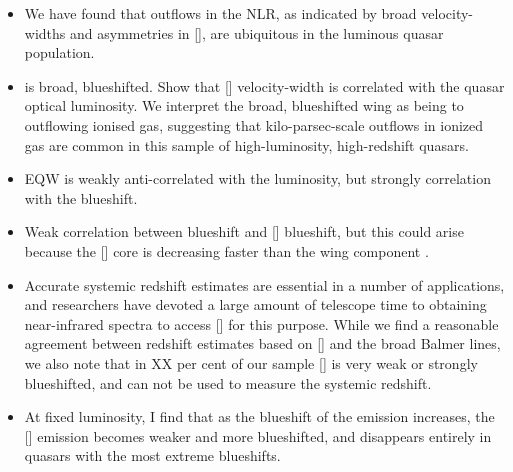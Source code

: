 \begin{itemize}

\item We have found that outflows in the NLR, as indicated by broad velocity-widths and asymmetries in [], are ubiquitous in the luminous quasar population. 

\item [\ion{O}{III}] is broad, blueshifted. Show that [] velocity-width is correlated with the quasar optical luminosity. We interpret the broad, blueshifted wing as being to outflowing ionised gas, suggesting that kilo-parsec-scale outflows in ionized gas are common in this sample of high-luminosity, high-redshift quasars.

\item [\ion{O}{III}] EQW is weakly anti-correlated with the luminosity, but strongly correlation with the  blueshift. 

\item Weak correlation between  blueshift and [] blueshift, but this could arise because the [] core is decreasing faster than the wing component \citep[e.g.][]{shen14}. 

\item Accurate systemic redshift estimates are essential in a number of applications, and researchers have devoted a large amount of telescope time to obtaining near-infrared spectra to access [] for this purpose. While we find a reasonable agreement between redshift estimates based on [] and the broad Balmer lines, we also note that in XX per cent of our sample [] is very weak or strongly blueshifted, and can not be used to measure the systemic redshift. 

\item At fixed luminosity, I find that as the blueshift of the  emission increases, the [] emission becomes weaker and more blueshifted, and disappears entirely in quasars with the most extreme  blueshifts.  

\end{itemize}





